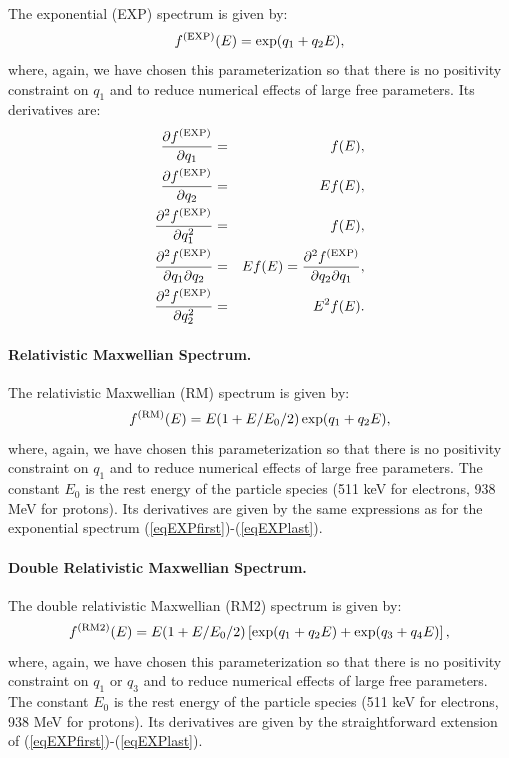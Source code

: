 \documentclass{article}    %
\newcommand{\subsubsubsection}[1]{\paragraph{#1.}}
\begin{document}
The exponential (EXP) spectrum is given by:
\begin{equation}
f^{\rm (EXP)}(E) = \exp(q_1 + q_2 E),
\end{equation}
where, again, we have chosen this parameterization so that there is no
positivity constraint on $q_1$ and to reduce numerical effects of
large free parameters.  Its derivatives are:
\begin{eqnarray}
\frac{\partial f^{\rm (EXP)}}{\partial q_1} &=& f(E), \label{eqEXPfirst} \\
\frac{\partial f^{\rm (EXP)}}{\partial q_2} &=& E f(E), \\
\frac{\partial^2 f^{\rm (EXP)}}{\partial q_1^2} &=& f(E), \\
\frac{\partial^2 f^{\rm (EXP)}}{\partial q_1\partial q_2} &=& E f(E) 
= \frac{\partial^2 f^{\rm (EXP)}}{\partial q_2\partial q_1}, \\
\frac{\partial^2 f^{\rm (EXP)}}{\partial q_2^2} &=& E^2 f(E). \label{eqEXPlast}
\end{eqnarray}

\subsubsubsection{Relativistic Maxwellian Spectrum}

The relativistic Maxwellian (RM) spectrum is given by:
\begin{equation}
f^{\rm (RM)}(E) = E(1+E/E_0/2)\exp(q_1 + q_2 E),
\end{equation}
where, again, we have chosen this parameterization so that there is no
positivity constraint on $q_1$ and to reduce numerical effects of
large free parameters. The constant $E_0$ is the rest energy of the
particle species (511 keV for electrons, 938 MeV for protons).  Its
derivatives are given by the same expressions as for the exponential
spectrum (\ref{eqEXPfirst})-(\ref{eqEXPlast}).

\subsubsubsection{Double Relativistic Maxwellian Spectrum}

The double relativistic Maxwellian (RM2) spectrum is given by:
\begin{equation}
f^{\rm (RM2)}(E) = E(1+E/E_0/2)\left[ \exp(q_1 + q_2 E) + \exp(q_3 + q_4 E) \right],
\end{equation}
where, again, we have chosen this parameterization so that there is no
positivity constraint on $q_1$ or $q_3$ and to reduce numerical effects
of large free parameters. The constant $E_0$ is the rest energy of the
particle species (511 keV for electrons, 938 MeV for protons).  Its
derivatives are given by the straightforward extension of
(\ref{eqEXPfirst})-(\ref{eqEXPlast}).
\end{document}
